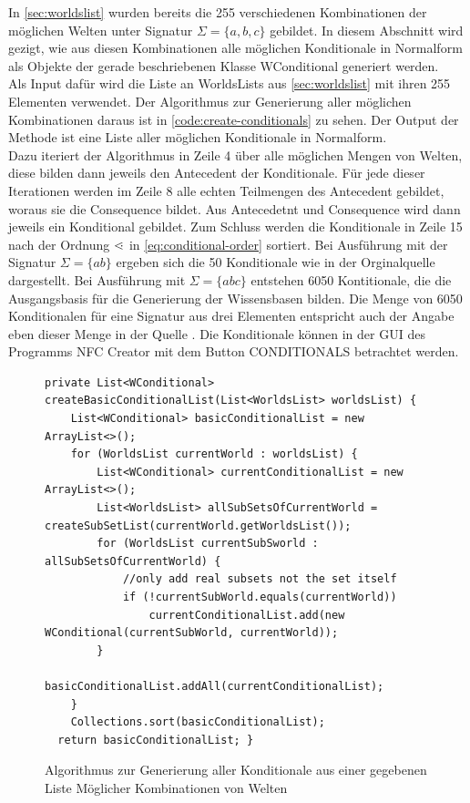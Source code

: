 \documentclass[12pt,a4paper]{article}
\newcommand\dotl{\mathrel{%
    \mathchoice{\QEQ}{\QEQ}{\QEQ}{\QEQ}%
}}
\def\QEQ{{%
    \setbox0\hbox{<}%
    \rlap{\hbox to \wd0{\hss \raisebox {0.1pt}{$\ \cdot$\hss}}}\box0
}}
\begin{document}
In \autoref{sec:worldslist} wurden bereits die 255 verschiedenen Kombinationen der möglichen Welten unter Signatur $\Sigma=\{a,b,c\}$ gebildet. In diesem Abschnitt wird gezigt, wie aus diesen Kombinationen alle möglichen Konditionale in Normalform als Objekte der gerade beschriebenen Klasse WConditional generiert werden. \\
Als Input dafür wird die Liste an WorldsLists aus \autoref{sec:worldslist} mit ihren 255 Elementen verwendet. Der Algorithmus zur Generierung aller möglichen Kombinationen daraus ist in \autoref{code:create-conditionals} zu sehen. Der Output der Methode ist eine Liste aller möglichen Konditionale in Normalform. \\
Dazu iteriert der Algorithmus in Zeile 4 über alle möglichen Mengen von Welten, diese bilden dann jeweils den Antecedent der Konditionale. Für jede dieser Iterationen werden im Zeile 8 alle echten Teilmengen des Antecedent gebildet, woraus sie die Consequence bildet. Aus Antecedetnt und Consequence wird dann jeweils ein Konditional gebildet. Zum Schluss werden die Konditionale in Zeile 15 nach der Ordnung $\dotl$ in \autoref{eq:conditional-order} sortiert. Bei Ausführung mit der Signatur $\Sigma=\{ab\}$ ergeben sich die 50 Konditionale wie in der Orginalquelle \cite{beierle19} dargestellt. Bei Ausführung mit $\Sigma=\{abc\}$ entstehen 6050 Kontitionale, die die Ausgangsbasis für die Generierung der Wissensbasen bilden. Die Menge von 6050 Konditionalen für eine Signatur aus drei Elementen entspricht auch der Angabe eben dieser Menge in  der Quelle \cite{beierle19b}. Die Konditionale können in der GUI des Programms NFC Creator mit dem Button CONDITIONALS betrachtet werden.

\begin{figure}
\begin{lstlisting}
private List<WConditional> createBasicConditionalList(List<WorldsList> worldsList) {
    List<WConditional> basicConditionalList = new ArrayList<>();
    for (WorldsList currentWorld : worldsList) {
        List<WConditional> currentConditionalList = new ArrayList<>();
        List<WorldsList> allSubSetsOfCurrentWorld = createSubSetList(currentWorld.getWorldsList());
        for (WorldsList currentSubSworld : allSubSetsOfCurrentWorld) {
            //only add real subsets not the set itself
            if (!currentSubWorld.equals(currentWorld))
                currentConditionalList.add(new WConditional(currentSubWorld, currentWorld));
        }
        basicConditionalList.addAll(currentConditionalList);
    }
    Collections.sort(basicConditionalList);
  return basicConditionalList; }
\end{lstlisting}
\caption{Algorithmus zur Generierung aller Konditionale aus einer gegebenen Liste Möglicher Kombinationen von Welten}
\label{code:create-conditionals}
\end{figure} 
\end{document}
